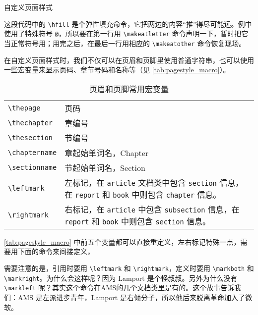 \begin{example}[htbp]
\caption{自定义页面样式}
\label{exa:def_pagestyle}
\end{example}

这段代码中的 \verb|\hfill| 是个弹性填充命令，它把两边的内容“推”得尽可能远。例中使用了特殊符号 \texttt{@}，所以要在第一行用 \verb|\makeatletter| 命令声明一下，暂时把它当正常符号用；用完之后，在最后一行用相应的 \verb|\makeatother| 命令恢复现场。

在自定义页面样式时，我们不仅可以在页眉和页脚里使用普通字符串，也可以使用一些宏变量来显示页码、章节号码和名称等（见 \autoref{tab:pagestyle_macro}）。

\begin{table}[!h]
\centering
\caption{页眉和页脚常用宏变量}
\label{tab:pagestyle_macro}
\begin{tabularx}{350pt}{lX}
  \toprule
  \verb|\thepage| & 页码 \\
  \verb|\thechapter| & 章编号 \\
  \verb|\thesection| & 节编号 \\
  \verb|\chaptername| & 章起始单词名，Chapter \\
  \verb|\sectionname| & 节起始单词名，Section \\
  \verb|\leftmark| & 左标记，在 \texttt{article} 文档类中包含 \texttt{section} 信息，在 \texttt{report} 和 \texttt{book} 中则包含 \texttt{chapter} 信息。\\
  \verb|\rightmark| & 右标记，在 \texttt{article} 中包含 \texttt{subsection} 信息，在 \texttt{report} 和 \texttt{book} 中则包含 \texttt{section} 信息。\\
  \bottomrule
\end{tabularx}
\end{table}

\autoref{tab:pagestyle_macro} 中前五个变量都可以直接重定义，左右标记特殊一点，需要用下面的命令来间接定义，

\begin{Code}[numbers=none]
\end{Code}

需要注意的是，引用时要用 \verb|\leftmark| 和 \verb|\rightmark|，定义时要用 \verb|\markboth| 和 \verb|\markright|。为什么会这样呢？因为 Lamport 是个怪叔叔。另外为什么没有 \verb|\markleft| 呢？其实这个命令在AMS的几个文档类里是有的。这个故事告诉我们：AMS 是左派进步青年，Lamport 是右倾分子，所以他后来脱离革命加入了微软。

